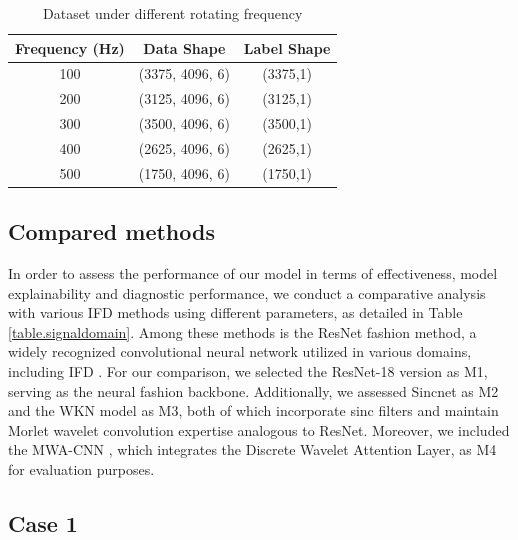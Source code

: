 \documentclass[lettersize,journal]{IEEEtran}
\begin{document}
\begin{table}[h]
    \centering
    \caption{Dataset under different rotating frequency}
    \begin{tabular*}{\linewidth}{@{\extracolsep{\fill}}ccc@{}} \hline
        
        \textbf{Frequency (Hz)} & \textbf{Data Shape} & \textbf{Label Shape} \\ \hline
        
        100 & (3375, 4096, 6) & (3375,1) \\
        
        200 & (3125, 4096, 6) & (3125,1) \\
        
        300 & (3500, 4096, 6) & (3500,1) \\
        
        400 & (2625, 4096, 6) & (2625,1) \\
        
        500 & (1750, 4096, 6) & (1750,1) \\ \hline
        
    \end{tabular*}
\label{WC}
\end{table}


\subsection{Compared methods}
In order to assess the performance of our model in terms of effectiveness, model explainability and diagnostic performance, we conduct a comparative analysis with various IFD methods using different parameters, as detailed in Table \ref{table.signaldomain}. Among these methods is the ResNet fashion method, a widely recognized convolutional neural network utilized in various domains, including IFD \cite{Wang2020}. For our comparison, we selected the ResNet-18 version as M1, serving as the neural fashion backbone. Additionally, we assessed Sincnet \cite{liu_sinc-based_2023} as M2 and the WKN model \cite{Li2022} as M3, both of which incorporate sinc filters and maintain Morlet wavelet convolution expertise analogous to ResNet. Moreover, we included the MWA-CNN \cite{Wang2023}, which integrates the Discrete Wavelet Attention Layer, as M4 for evaluation purposes.


\subsection{Case 1}
\end{document}
